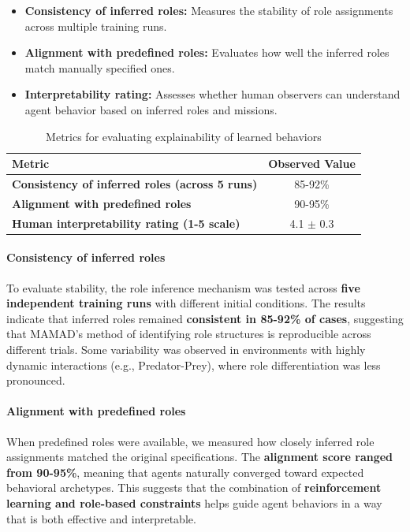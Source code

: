 \documentclass[pdflatex,sn-mathphys-num]{sn-jnl}%
\theoremstyle{thmstyleone}%
\theoremstyle{thmstyletwo}%
\theoremstyle{thmstylethree}%
\begin{document}
\begin{itemize}
    \item \textbf{Consistency of inferred roles:} Measures the stability of role assignments across multiple training runs.
    \item \textbf{Alignment with predefined roles:} Evaluates how well the inferred roles match manually specified ones.
    \item \textbf{Interpretability rating:} Assesses whether human observers can understand agent behavior based on inferred roles and missions.
\end{itemize}

\begin{table}[h!]
    \centering
    \caption{Metrics for evaluating explainability of learned behaviors}
    \begin{tabular}{|l|c|}
        \hline
        \textbf{Metric} & \textbf{Observed Value} \\
        \hline
        \textbf{Consistency of inferred roles (across 5 runs)} & 85-92\% \\
        \hline
        \textbf{Alignment with predefined roles} & 90-95\% \\
        \hline
        \textbf{Human interpretability rating (1-5 scale)} & 4.1 $\pm$ 0.3 \\
        \hline
    \end{tabular}
    \label{tab:explainability}
\end{table}

\paragraph{Consistency of inferred roles} 
To evaluate stability, the role inference mechanism was tested across \textbf{five independent training runs} with different initial conditions. The results indicate that inferred roles remained \textbf{consistent in 85-92\% of cases}, suggesting that MAMAD’s method of identifying role structures is reproducible across different trials. Some variability was observed in environments with highly dynamic interactions (e.g., Predator-Prey), where role differentiation was less pronounced.

\paragraph{Alignment with predefined roles}
When predefined roles were available, we measured how closely inferred role assignments matched the original specifications. The \textbf{alignment score ranged from 90-95\%}, meaning that agents naturally converged toward expected behavioral archetypes. This suggests that the combination of \textbf{reinforcement learning and role-based constraints} helps guide agent behaviors in a way that is both effective and interpretable.
\end{document}
